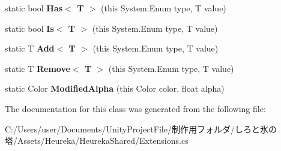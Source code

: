 \begin{DoxyCompactItemize}
static bool {\bfseries Has$<$ T $>$} (this System.\+Enum type, T value)
\item 
\mbox{\label{class_heureka_games_1_1_extensions_ad395f53105a980cc7886b86ab750d0e1}} 
static bool {\bfseries Is$<$ T $>$} (this System.\+Enum type, T value)
\item 
\mbox{\label{class_heureka_games_1_1_extensions_aa3748db70ff7c9c07ca9a3ea087280a7}} 
static T {\bfseries Add$<$ T $>$} (this System.\+Enum type, T value)
\item 
\mbox{\label{class_heureka_games_1_1_extensions_ac8c621274f030750fbf4d647f1974d25}} 
static T {\bfseries Remove$<$ T $>$} (this System.\+Enum type, T value)
\item 
\mbox{\label{class_heureka_games_1_1_extensions_a353b1b36d90ca86a398508700c41a406}} 
static Color {\bfseries Modified\+Alpha} (this Color color, float alpha)
\end{DoxyCompactItemize}


The documentation for this class was generated from the following file\+:\begin{DoxyCompactItemize}
\item 
C\+:/\+Users/user/\+Documents/\+Unity\+Project\+File/制作用フォルダ/しろと氷の塔/\+Assets/\+Heureka/\+Heureka\+Shared/Extensions.\+cs\end{DoxyCompactItemize}
